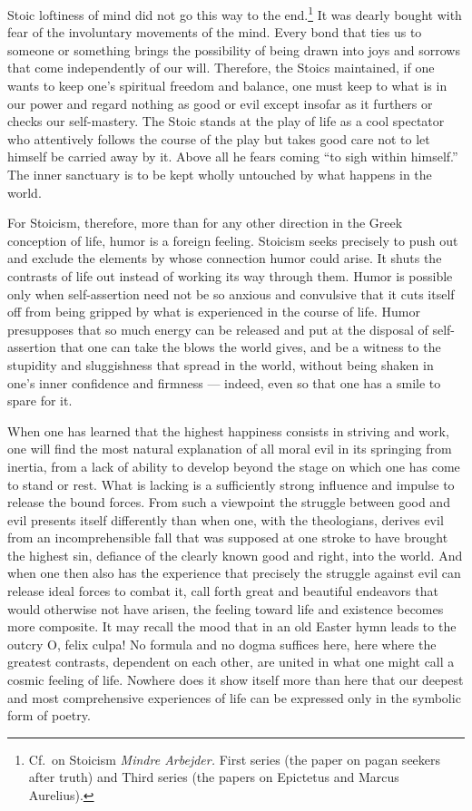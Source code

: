 \documentclass[12pt]{book}
\newcommand{\opage}[1]{\marginnote{\footnotesize\textit{[#1]}}}
\begin{document}
Stoic loftiness of mind did not go this way to the end.\footnote{Cf.\ on Stoicism
\textit{Mindre Arbejder.} First series (the paper on pagan seekers after truth) and
Third series (the papers on Epictetus and Marcus Aurelius).} It was dearly bought with
fear of the involuntary movements of the mind. Every bond that ties us to someone or
something brings the possibility of being drawn into joys and sorrows that come
independently of our will. Therefore, the Stoics maintained, if one wants to keep
one's spiritual freedom and balance, one must keep to what is in our power and regard
nothing as good or evil except insofar as it furthers or checks our self-mastery. The
Stoic stands at the play of life as a cool spectator who attentively follows the
course of the play but takes good care not to let himself be carried away by it. Above
all he fears coming ``to sigh within himself.'' The inner sanctuary is to be kept
wholly untouched by what happens in the world.

For Stoicism, therefore, more than for any other direction in the Greek conception of
life, humor is a foreign feeling. Stoicism seeks precisely to push out and exclude the
elements by whose connection humor could arise. It shuts the contrasts of life out
instead of working its way through them. Humor is possible only when self-assertion
need not be so anxious and convulsive that it cuts itself off from being gripped by
what is experienced in the course of life. Humor presupposes that so much energy can be
released and put at the disposal of self-assertion that one can take the blows the
world gives, and be a witness to the stupidity and sluggishness that spread in the
world, without being shaken in one's inner confidence and firmness --- indeed, even so
that one has a smile to spare for it.

\opage{80}When one has learned that the highest happiness consists in striving and
work, one will find the most natural explanation of all moral evil in its springing
from inertia, from a lack of ability to develop beyond the stage on which one has
come to stand or rest. What is lacking is a sufficiently strong influence and impulse
to release the bound forces. From such a viewpoint the struggle between good and evil
presents itself differently than when one, with the theologians, derives evil from an
incomprehensible fall that was supposed at one stroke to have brought the highest
sin, defiance of the clearly known good and right, into the world. And when one then
also has the experience that precisely the struggle against evil can release ideal
forces to combat it, call forth great and beautiful endeavors that would otherwise not
have arisen, the feeling toward life and existence becomes more composite. It may
recall the mood that in an old Easter hymn leads to the outcry O, felix culpa! No
formula and no dogma suffices here, here where the greatest contrasts, dependent on
each other, are united in what one might call a cosmic feeling of life. Nowhere does it
show itself more than here that our deepest and most comprehensive experiences of life
can be expressed only in the symbolic form of poetry.
\end{document}
